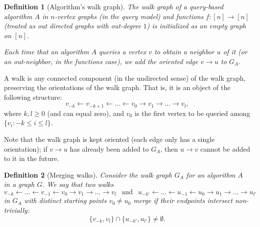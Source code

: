 \documentclass[11pt]{article}
\numberwithin{equation}{section}
\newtheorem{definition}[definition]{Definition}
\newcommand{\1}{\mathbf{1}}
\begin{document}
\begin{definition}[Algorithm's walk graph]
\label{def:walk-graph}
The walk graph of a query-based algorithm $A$ in $n$-vertex graphs (in the query model) and functions $f \colon [n] \to [n]$ (treated as out directed graphs with out-degree $1$) is initialized as an empty graph on $[n]$. 

Each time that an algorithm $A$ queries a vertex $v$ to obtain a neighbor $u$ of it (or an out-neighbor, in the functions case), we add the oriented edge $v \to u$ to $G_A$. 
\end{definition}
A walk is any connected component (in the undirected sense) of the walk graph, preserving the orientations of the walk graph. That is, it is an object of the following structure:
$$
v_{-k} \leftarrow v_{-k+1} \leftarrow \ldots \leftarrow v_0 \rightarrow v_1 \rightarrow \ldots \rightarrow v_l,
$$
where $k,l \geq 0$ (and can equal zero), and $v_0$ is the first vertex to be queried among $\{v_i : -k \leq i \leq l\}$.

Note that the walk graph is kept oriented (each edge only has a single orientation); if $v \to u$ has already been added to $G_A$, then $u \to v$ cannot be added to it in the future.

\begin{definition}[Merging walks]
\label{def:merging_walks}
Consider the walk graph $G_A$ for an algorithm $A$ in a graph $G$. We say that two walks $$v_{-k} \leftarrow \ldots \leftarrow v_{-1} \leftarrow v_0 \to v_1 \to \ldots \to v_l \ \ \text{ and }\ \  u_{-k'} \leftarrow \ldots \leftarrow u_{-1} \leftarrow u_0 \to u_1 \to \ldots \to u_{l'}$$ 
in $G_A$ with distinct starting points $v_0 \neq u_0$ \emph{merge} if their endpoints intersect non-trivially: $$\{v_{-k}, v_l\} \cap \{u_{-k'}, u_{l'}\} \neq \emptyset.$$ 
\end{definition}
\end{document}
